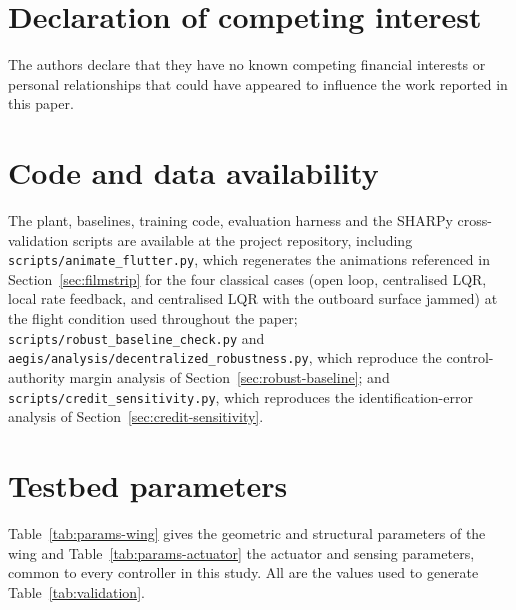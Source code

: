 \documentclass[preprint,11pt,authoryear]{elsarticle}
\begin{document}
\section*{Declaration of competing interest}
The authors declare that they have no known competing financial interests or
personal relationships that could have appeared to influence the work reported
in this paper.

\section*{Code and data availability}
The plant, baselines, training code, evaluation harness and the SHARPy
cross-validation scripts are available at the project repository, including
\texttt{scripts/animate\_flutter.py}, which regenerates the animations
referenced in Section~\ref{sec:filmstrip} for the four classical cases (open
loop, centralised LQR, local rate feedback, and centralised LQR with the
outboard surface jammed) at the flight condition used throughout the paper;
\texttt{scripts/robust\_baseline\_check.py} and
\texttt{aegis/analysis/decentralized\_robustness.py}, which reproduce the
control-authority margin analysis of Section~\ref{sec:robust-baseline}; and
\texttt{scripts/credit\_sensitivity.py}, which reproduces the identification-error
analysis of Section~\ref{sec:credit-sensitivity}.

\appendix

\section{Testbed parameters}
\label{app:parameters}

Table~\ref{tab:params-wing} gives the geometric and structural parameters of the
wing and Table~\ref{tab:params-actuator} the actuator and sensing parameters,
common to every controller in this study. All are the values used to generate
Table~\ref{tab:validation}.
\end{document}
